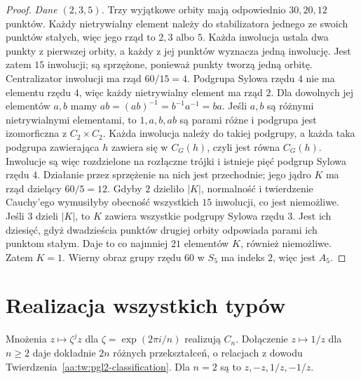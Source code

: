 \begin{proof}
\emph{Dane $(2,3,5)$.} Trzy wyjątkowe orbity mają
odpowiednio $30,20,12$ punktów.
Każdy nietrywialny element należy do stabilizatora
jednego ze swoich punktów stałych, więc jego rząd
to $2,3$ albo $5$.
Każda inwolucja ustala dwa punkty z pierwszej orbity,
a każdy z jej punktów wyznacza jedną inwolucję.
Jest zatem $15$ inwolucji; są sprzężone, ponieważ
punkty tworzą jedną orbitę. Centralizator inwolucji
ma rząd $60/15=4$.
Podgrupa Sylowa rzędu $4$ nie ma elementu rzędu $4$,
więc każdy nietrywialny element ma rząd $2$.
Dla dowolnych jej elementów $a,b$ mamy
$ab=(ab)^{-1}=b^{-1}a^{-1}=ba$.
Jeśli $a,b$ są różnymi nietrywialnymi elementami,
to $1,a,b,ab$ są parami różne i podgrupa jest
izomorficzna z $C_2\times C_2$.
Każda inwolucja należy do takiej podgrupy, a każda
taka podgrupa zawierająca $h$ zawiera się w $C_G(h)$,
czyli jest równa $C_G(h)$. Inwolucje są więc rozdzielone
na rozłączne trójki i istnieje pięć podgrup Sylowa rzędu $4$.
Działanie przez sprzężenie na nich jest przechodnie;
jego jądro $K$ ma rząd dzielący $60/5=12$.
Gdyby $2$ dzieliło $|K|$, normalność i twierdzenie
Cauchy'ego wymusiłyby obecność wszystkich $15$ inwolucji,
co jest niemożliwe. Jeśli $3$ dzieli $|K|$, to $K$
zawiera wszystkie podgrupy Sylowa rzędu $3$.
Jest ich dziesięć, gdyż dwadzieścia punktów drugiej
orbity odpowiada parami ich punktom stałym.
Daje to co najmniej $21$ elementów $K$, również niemożliwe.
Zatem $K=1$. Wierny obraz grupy rzędu $60$ w $S_5$
ma indeks $2$, więc jest $A_5$.
\end{proof}

\section{Realizacja wszystkich typów}

\begin{przyklad}
\label{aa:prz:pgl2-cyclic-dihedral}
Mnożenia $z\mapsto\zeta^jz$ dla $\zeta=\exp(2\pi i/n)$
realizują $C_n$. Dołączenie $z\mapsto1/z$ dla $n\ge2$
daje dokładnie $2n$ różnych przekształceń, o relacjach
z dowodu Twierdzenia~\ref{aa:tw:pgl2-classification}.
Dla $n=2$ są to $z,-z,1/z,-1/z$.
\end{przyklad}

